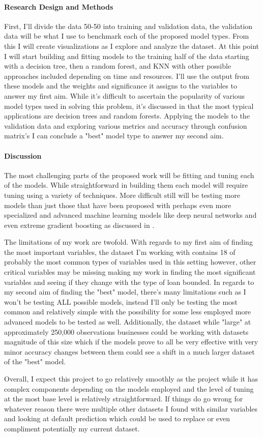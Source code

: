 \documentclass[12pt]{article}
\begin{document}
\paragraph{Research Design and Methods}
First, I'll divide the data 50-50 into training and validation data, the validation data will be what I use to benchmark each of the proposed model types. From this I will create visualizations as I explore and analyze the dataset. At this point I will start building and fitting models to the training half of the data starting with a decision tree, then a random forest, and KNN with other possible approaches included depending on time and resources. I'll use the output from these models and the weights and significance it assigns to the variables to answer my first aim. While it's difficult to ascertain the popularity of various model types used in solving this problem, it's discussed in \cite{madaan2021loan} that the most typical applications are decision trees and random forests. Applying the models to the validation data and exploring various metrics and accuracy through confusion matrix's I can conclude a "best" model type to answer my second aim.   

\paragraph{Discussion}
The most challenging parts of the proposed work will be fitting and tuning each of the models. While straightforward in building them each model will require tuning using a variety of techniques. More difficult still will be testing more models than just those that have been proposed with perhaps even more specialized and advanced machine learning models like deep neural networks and even extreme gradient boosting as discussed in \cite{lai2020loan}. 
\par The limitations of my work are twofold. With regards to my first aim of finding the most important variables, the dataset I'm working with contains 18 of probably the most common types of variables used in this setting however, other critical variables may be missing making my work in finding the most significant variables and seeing if they change with the type of loan bounded. In regards to my second aim of finding the "best" model, there's many limitations such as I won't be testing ALL possible models, instead I'll only be testing the most common and relatively simple with the possibility for some less employed more advanced models to be tested as well. Additionally, the dataset while "large" at approximately 250,000 observations businesses could be working with datasets magnitude of this size which if the models prove to all be very effective with very minor accuracy changes between them could see a shift in a much larger dataset of the "best" model.  
\par Overall, I expect this project to go relatively smoothly as the project while it has complex components depending on the models employed and the level of tuning at the most base level is relatively straightforward. If things do go wrong for whatever reason there were multiple other datasets I found with similar variables and looking at default prediction which could be used to replace or even compliment potentially my current dataset.



\end{document}
